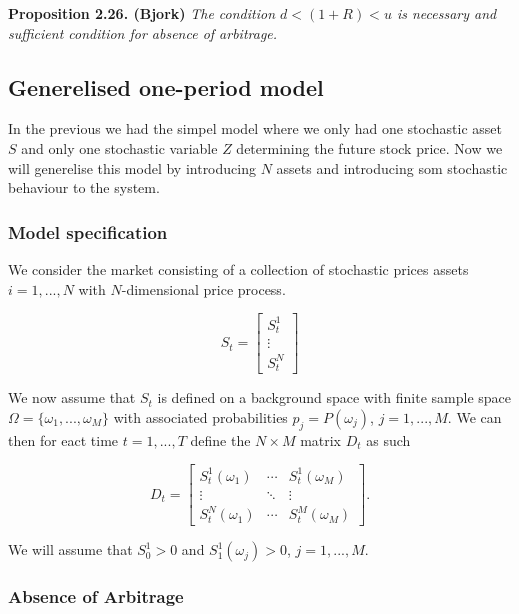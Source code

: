 \documentclass[
]{book}
\begin{document}
\textbf{Proposition 2.26. (Bjork)} \emph{The condition \(d<(1+R)<u\) is necessary and sufficient condition for absence of arbitrage.}

\newpage

\hypertarget{generelised-one-period-model}{%
\subsection{Generelised one-period model}\label{generelised-one-period-model}}

In the previous we had the simpel model where we only had one stochastic asset \(S\) and only one stochastic variable \(Z\) determining the future stock price. Now we will generelise this model by introducing \(N\) assets and introducing som stochastic behaviour to the system.

\hypertarget{model-specification}{%
\subsubsection{Model specification}\label{model-specification}}

We consider the market consisting of a collection of stochastic prices assets \(i=1,...,N\) with \(N\)-dimensional price process.

\[
S_t=\begin{bmatrix} S_t^1\\
\vdots\\
S_t^N\end{bmatrix}
\]

We now assume that \(S_t\) is defined on a background space with finite sample space \(\Omega = \{\omega_1,...,\omega_M\}\) with associated probabilities \(p_j=P(\omega_j)\), \(j=1,...,M\). We can then for eact time \(t=1,...,T\) define the \(N\times M\) matrix \(D_t\) as such

\[
D_t=\begin{bmatrix} S_t^1(\omega_1)&\cdots &S_t^1(\omega_M)\\
\vdots &\ddots & \vdots\\
S_t^N(\omega_1) &\cdots&S_t^M(\omega_M)\end{bmatrix}.
\]

We will assume that \(S_0^1>0\) and \(S_1^1(\omega_j)>0\), \(j=1,...,M\).

\hypertarget{absence-of-arbitrage}{%
\subsubsection{Absence of Arbitrage}\label{absence-of-arbitrage}}
\end{document}
